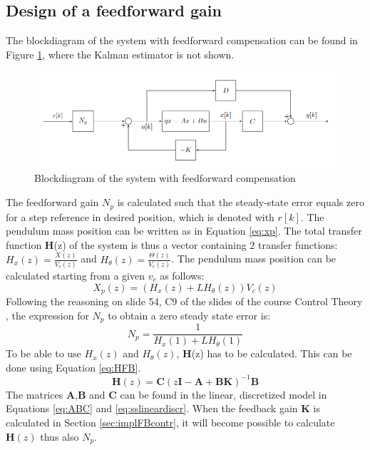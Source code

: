 \documentclass[a4paper,kul]{kulakarticle} %
\begin{document}
\subsection{Design of a feedforward gain}
\label{sec:FF}
The blockdiagram of the system with feedforward compensation can be found in Figure \ref{fig:blockdiagram}, where the Kalman estimator is not shown. 

\begin{figure}[htp!]
	\centering
	\includegraphics[width=.7\linewidth]{blockdiagram.png}
	\caption{Blockdiagram of the system with feedforward compensation }
	\label{fig:blockdiagram}
\end{figure}
The feedforward gain $N_p$ is calculated such that the steady-state error equals zero for a step reference in desired position, which is denoted with $r[k]$. The pendulum mass position can be written as in Equation \ref{eq:xp}. The total transfer function \textbf{H}(z) of the system is thus a vector containing 2 transfer functions: $H_x(z) = \frac{X(z)}{V_c(z)}$ and $H_{\theta}(z) = \frac{\Theta(z)}{V_c(z)}$. The pendulum mass position can be calculated starting from a given $v_c$ as follows:
\begin{equation}
X_p(z) = (H_x(z) + LH_\theta(z))V_c(z)
\end{equation}
Following the reasoning on slide 54, C9 of the slides of the course Control Theory \cite{slidescontroltheory}, the expression for $N_p$ to  obtain a zero steady state error is: 
\begin{equation}
N_p = \frac{1}{H_x(1) + LH_\theta(1)}
\end{equation}
To be able to use $H_x(z)$ and $H_\theta(z)$, \textbf{H}(z) has to be calculated. This can be done using Equation \ref{eq:HFB}. 
\begin{equation}
\mathbf{H}(z) = \mathbf{C}(z\mathbf{I}-\mathbf{A}+\mathbf{BK})^{-1}\mathbf{B}
\label{eq:HFB}
\end{equation}
The matrices $\mathbf{A}$,$\mathbf{B}$ and $\mathbf{C}$ can be found in the linear, discretized model in Equations \ref{eq:ABC} and \ref{eq:sslineardiscr}. When the feedback gain $\mathbf{K}$ is calculated in Section \ref{sec:implFBcontr}, it will become possible to calculate $\mathbf{H}(z)$ thus also $N_p$. 
\end{document}
